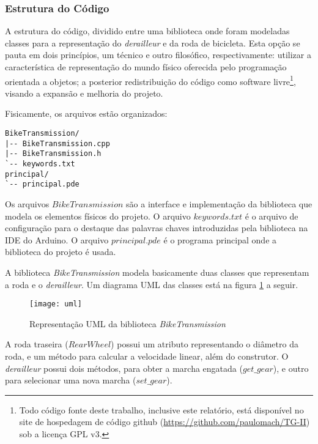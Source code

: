 \documentclass[a4paper,11pt]{article}
\begin{document}
\subsubsection{Estrutura do Código}
\label{sec:implemt}

A estrutura do código, dividido entre uma biblioteca onde foram modeladas
classes para a representação do \textit{derailleur} e da roda de bicicleta. Esta
opção se pauta em dois princípios, um técnico e outro filosófico,
respectivamente: utilizar a característica de representação do mundo físico
oferecida pelo programação orientada a objetos; a posterior redistribuição do
código como software livre\footnote{Todo código fonte deste trabalho, inclusive
este relatório, está disponível no site de hospedagem de código github
(\url{https://github.com/paulomach/TG-II}) sob a licença GPL v3\cite{gpl}.},
visando a expansão e melhoria do projeto.

Fisicamente, os arquivos estão organizados:

\begin{verbatim}
BikeTransmission/
|-- BikeTransmission.cpp
|-- BikeTransmission.h
`-- keywords.txt
principal/
`-- principal.pde
\end{verbatim}

Os arquivos $BikeTransmission$ são a interface e implementação da biblioteca
que modela os elementos físicos do projeto. O arquivo $keywords.txt$ é o arquivo
de configuração para o destaque das palavras chaves introduzidas pela biblioteca
na IDE do Arduino. O arquivo $principal.pde$ é o programa principal onde a
biblioteca do projeto é usada.

A biblioteca \textit{BikeTransmission} modela basicamente duas classes que
representam a roda e o \textit{derailleur}. Um diagrama UML das classes está na
figura \ref{fig:uml} a seguir.

\begin{figure}[h!]
\begin{center}
  \texttt{[image: uml]}
\end{center}
  \caption{Representação UML da biblioteca \textit{BikeTransmission}}
  \label{fig:uml}
\end{figure}

A roda traseira ($RearWheel$) possui um atributo representando o diâmetro da
roda, e um método para calcular a velocidade linear, além do construtor. O
\textit{derailleur} possui dois métodos, para obter a marcha engatada
($get\_gear$), e outro para selecionar uma nova marcha ($set\_gear$).
\end{document}
